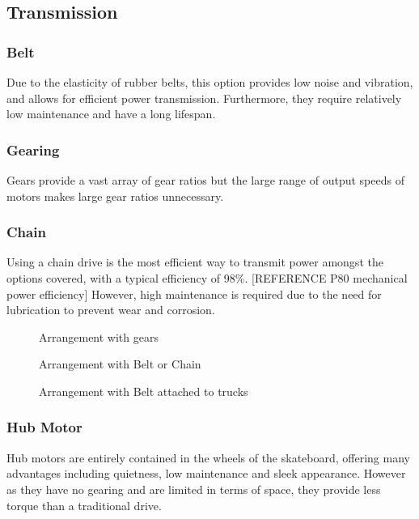 \documentclass[journal,10pt]{IEEEtran}
\begin{document}
    \subsection{Transmission}
        \subsubsection{Belt}
            Due to the elasticity of rubber belts, this option provides low noise and vibration, and allows for efficient power transmission. Furthermore, they require relatively low maintenance and have a long lifespan. 
        \subsubsection{Gearing}
            Gears provide a vast array of gear ratios but the large range of output speeds of motors makes large gear ratios unnecessary.
        \subsubsection{Chain}
            Using a chain drive is the most efficient way to transmit power amongst the options covered, with a typical efficiency of 98\%. [REFERENCE P80 mechanical power efficiency] However, high maintenance is required due to the need for lubrication to prevent wear and corrosion. 
        \begin{figure}[H]
            \centering
            \caption{Arrangement with gears}
            \label{fig:Drivetrain1}
        \end{figure}
        \begin{figure}[H]
            \centering
            \caption{Arrangement with Belt or Chain}
            \label{fig:Drivetrain2}
        \end{figure}
        \begin{figure}[H]
            \centering
            \caption{Arrangement with Belt attached to trucks}
            \label{fig:Drivetrain3}
        \end{figure}
        \subsubsection{Hub Motor}
            Hub motors are entirely contained in the wheels of the skateboard, offering many advantages including quietness, low maintenance and sleek appearance.
            However as they have no gearing and are limited in terms of space, they provide less torque than a traditional drive. %
\end{document}
